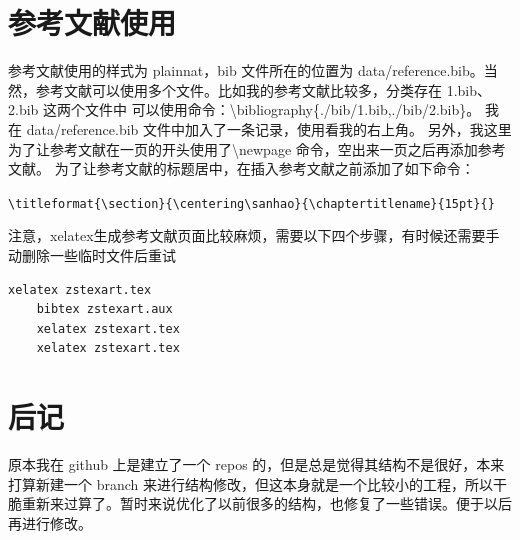 \documentclass[a4paper,oneside,cs4size,fancyhdr]{ctexart}
\begin{document}
\section{参考文献使用}
参考文献使用的样式为 plainnat，bib 文件所在的位置为 data/reference.bib。当然，参考文献可以使用多个文件。比如我的参考文献比较多，分类存在 1.bib、2.bib 这两个文件中
可以使用命令：\textbackslash{}bibliography\{./bib/1.bib,./bib/2.bib\}。
我在 data/reference.bib 文件中加入了一条记录，使用看我的右上角\cite{刘海洋2013latex}。
另外，我这里为了让参考文献在一页的开头使用了\textbackslash{}newpage 命令，空出来一页之后再添加参考文献。
为了让参考文献的标题居中，在插入参考文献之前添加了如下命令：

\verb|\titleformat{\section}{\centering\sanhao}{\chaptertitlename}{15pt}{}|

注意，xelatex生成参考文献页面比较麻烦，需要以下四个步骤，有时候还需要手动删除一些临时文件后重试

\begin{lstlisting}[language=bash]
    xelatex zstexart.tex
    bibtex zstexart.aux
    xelatex zstexart.tex
    xelatex zstexart.tex
\end{lstlisting}

\section{后记}
原本我在 github 上是建立了一个 repos 的，但是总是觉得其结构不是很好，本来打算新建一个 branch 来进行结构修改，但这本身就是一个比较小的工程，所以干脆重新来过算了。暂时来说优化了以前很多的结构，也修复了一些错误。便于以后再进行修改。

\newpage
\titleformat{\section}{\centering\sanhao}{\chaptertitlename}{15pt}{}


\end{document}
